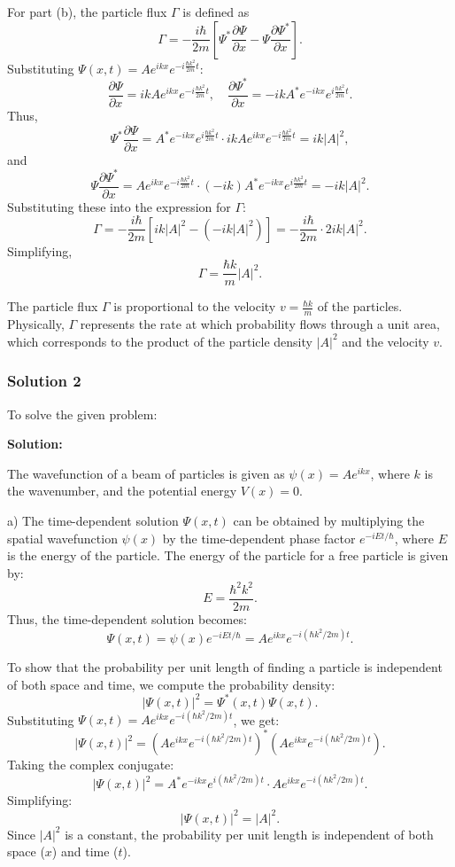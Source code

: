 \documentclass{article}
\begin{document}
For part (b), the particle flux $\Gamma$ is defined as  
\[
\Gamma = -\frac{i \hbar}{2m} \left[\Psi^* \frac{\partial \Psi}{\partial x} - \Psi \frac{\partial \Psi^*}{\partial x}\right].
\]  
Substituting $\Psi(x,t) = A e^{ikx} e^{-i \frac{\hbar k^2}{2m} t}$:  
\[
\frac{\partial \Psi}{\partial x} = ik A e^{ikx} e^{-i \frac{\hbar k^2}{2m} t}, \quad \frac{\partial \Psi^*}{\partial x} = -ik A^* e^{-ikx} e^{i \frac{\hbar k^2}{2m} t}.
\]  
Thus,  
\[
\Psi^* \frac{\partial \Psi}{\partial x} = A^* e^{-ikx} e^{i \frac{\hbar k^2}{2m} t} \cdot ik A e^{ikx} e^{-i \frac{\hbar k^2}{2m} t} = ik |A|^2,
\]  
and  
\[
\Psi \frac{\partial \Psi^*}{\partial x} = A e^{ikx} e^{-i \frac{\hbar k^2}{2m} t} \cdot (-ik) A^* e^{-ikx} e^{i \frac{\hbar k^2}{2m} t} = -ik |A|^2.
\]  
Substituting these into the expression for $\Gamma$:  
\[
\Gamma = -\frac{i \hbar}{2m} \left[ik |A|^2 - (-ik |A|^2)\right] = -\frac{i \hbar}{2m} \cdot 2ik |A|^2.
\]  
Simplifying,  
\[
\Gamma = \frac{\hbar k}{m} |A|^2.
\]  

The particle flux $\Gamma$ is proportional to the velocity $v = \frac{\hbar k}{m}$ of the particles. Physically, $\Gamma$ represents the rate at which probability flows through a unit area, which corresponds to the product of the particle density $|A|^2$ and the velocity $v$.



\subsubsection{Solution 2}
To solve the given problem:

\textbf{Solution:}

The wavefunction of a beam of particles is given as $\psi(x) = A e^{ikx}$, where $k$ is the wavenumber, and the potential energy $V(x) = 0$.

a) The time-dependent solution $\Psi(x,t)$ can be obtained by multiplying the spatial wavefunction $\psi(x)$ by the time-dependent phase factor $e^{-iEt/\hbar}$, where $E$ is the energy of the particle. The energy of the particle for a free particle is given by:
\[
E = \frac{\hbar^2 k^2}{2m}.
\]
Thus, the time-dependent solution becomes:
\[
\Psi(x,t) = \psi(x)e^{-iEt/\hbar} = A e^{ikx} e^{-i(\hbar k^2 / 2m)t}.
\]

To show that the probability per unit length of finding a particle is independent of both space and time, we compute the probability density:
\[
|\Psi(x,t)|^2 = \Psi^*(x,t)\Psi(x,t).
\]
Substituting $\Psi(x,t) = A e^{ikx} e^{-i(\hbar k^2 / 2m)t}$, we get:
\[
|\Psi(x,t)|^2 = \left(A e^{ikx} e^{-i(\hbar k^2 / 2m)t}\right)^* \left(A e^{ikx} e^{-i(\hbar k^2 / 2m)t}\right).
\]
Taking the complex conjugate:
\[
|\Psi(x,t)|^2 = A^* e^{-ikx} e^{i(\hbar k^2 / 2m)t} \cdot A e^{ikx} e^{-i(\hbar k^2 / 2m)t}.
\]
Simplifying:
\[
|\Psi(x,t)|^2 = |A|^2.
\]
Since $|A|^2$ is a constant, the probability per unit length is independent of both space ($x$) and time ($t$).
\end{document}
